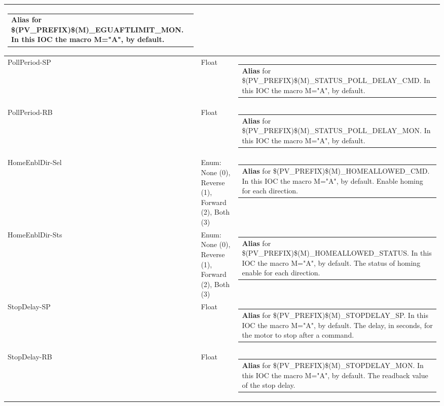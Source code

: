 \documentclass[openany]{article}
\begin{document}
\begin{longtable}{| m{4.5cm} m{2.5cm}  m{8.5cm} |}
\begin{tabular}{@{}m{6cm}@{}}
                \textbf{\color{blue} Alias} for \$(PV\_PREFIX)\$(M)\_EGUAFTLIMIT\_MON. In this IOC the macro M="A", by default.
            \end{tabular} \hypertarget{pv:poll-period}{}\\ \hline
        PollPeriod-SP & Float & \begin{tabular}{@{}m{6cm}@{}}
                \textbf{\color{blue} Alias} for \$(PV\_PREFIX)\$(M)\_STATUS\_POLL\_DELAY\_CMD. In this IOC the macro M="A", by default.
            \end{tabular} \hypertarget{}{}\\ \hline
        PollPeriod-RB & Float & \begin{tabular}{@{}m{6cm}@{}}
                \textbf{\color{blue} Alias} for \$(PV\_PREFIX)\$(M)\_STATUS\_POLL\_DELAY\_MON. In this IOC the macro M="A", by default.
            \end{tabular} \hypertarget{pv:home-enbl-dir}{}\\ \hline
        HomeEnblDir-Sel & Enum: None (0), Reverse (1), Forward (2), Both (3) & \begin{tabular}{@{}m{6cm}@{}}
                \textbf{\color{blue} Alias} for \$(PV\_PREFIX)\$(M)\_HOMEALLOWED\_CMD. In this IOC the macro M="A", by default. Enable homing for each direction.
            \end{tabular} \hypertarget{}{}\\ \hline
        HomeEnblDir-Sts & Enum: None (0), Reverse (1), Forward (2), Both (3) & \begin{tabular}{@{}m{6cm}@{}}
                \textbf{\color{blue} Alias} for \$(PV\_PREFIX)\$(M)\_HOMEALLOWED\_STATUS. In this IOC the macro M="A", by default. The status of homing enable for each direction.
            \end{tabular} \hypertarget{pv:stop-delay}{}\\ \hline
        StopDelay-SP & Float & \begin{tabular}{@{}m{6cm}@{}}
                \textbf{\color{blue} Alias} for \$(PV\_PREFIX)\$(M)\_STOPDELAY\_SP. In this IOC the macro M="A", by default. The delay, in seconds, for the motor to stop after a command.
            \end{tabular} \hypertarget{}{}\\ \hline
        StopDelay-RB & Float & \begin{tabular}{@{}m{6cm}@{}}
                \textbf{\color{blue} Alias} for \$(PV\_PREFIX)\$(M)\_STOPDELAY\_MON. In this IOC the macro M="A", by default. The readback value of the stop delay.

\end{tabular}
\end{longtable}
\end{document}
